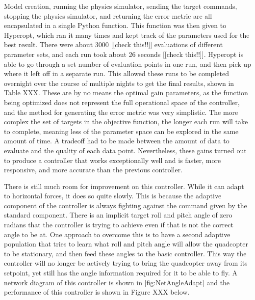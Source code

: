 \documentclass[letterpaper,12pt,titlepage,oneside,final]{book}
\begin{document}
Model creation, running the physics simulator, sending the target commands, stopping the physics simulator, and returning the error metric are all encapsulated in a single Python function. 
This function was then given to Hyperopt, which ran it many times and kept track of the parameters used for the best result. There were about 3000 [[check this!!]] evaluations of different parameter sets, and each run took about 26 seconds [[check this!!]]. 
Hyperopt is able to go through a set number of evaluation points in one run, and then pick up where it left off in a separate run. This allowed these runs to be completed overnight over the course of multiple nights to get the final results, shown in Table XXX. 
These are by no means the optimal gain parameters, as the function being optimized does not represent the full operational space of the controller, and the method for generating the error metric was very simplistic. 
The more complex the set of targets in the objective function, the longer each run will take to complete, meaning less of the parameter space can be explored in the same amount of time. 
A tradeoff had to be made between the amount of data to evaluate and the quality of each data point. 
Nevertheless, these gains turned out to produce a controller that works exceptionally well and is faster, more responsive, and more accurate than the previous controller.



There is still much room for improvement on this controller. 
While it can adapt to horizontal forces, it does so quite slowly. 
This is because the adaptive component of the controller is always fighting against the command given by the standard component. 
There is an implicit target roll and pitch angle of zero radians that the controller is trying to achieve even if that is not the correct angle to be at. 
One approach to overcome this is to have a second adaptive population that tries to learn what roll and pitch angle will allow the quadcopter to be stationary, and then feed these angles to the basic controller. 
This way the controller will no longer be actively trying to bring the quadcopter away from its setpoint, yet still has the angle information required for it to be able to fly. 
A network diagram of this controller is shown in \autoref{fig:NetAngleAdapt} and the performance of this controller is shown in Figure XXX below.
\end{document}
